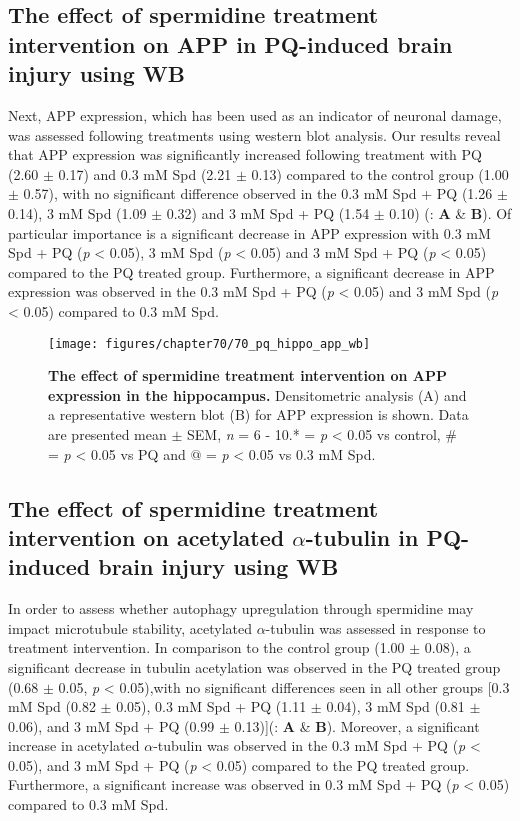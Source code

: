 \subsection{The effect of spermidine treatment intervention on APP in PQ-induced brain injury using WB}
Next, APP expression, which has been used as an indicator of neuronal damage, was assessed following treatments using western blot analysis. Our results reveal that APP expression was significantly increased following treatment with PQ (2.60 $\pm$ 0.17) and 0.3 mM Spd (2.21 $\pm$ 0.13) compared to the control group (1.00 $\pm$ 0.57), with no significant difference observed in the 0.3 mM Spd + PQ (1.26 $\pm$ 0.14), 3 mM Spd (1.09 $\pm$ 0.32) and 3 mM Spd + PQ (1.54 $\pm$ 0.10) (: \textbf{A} \& \textbf{B}). Of particular importance is a significant decrease in APP expression with 0.3 mM Spd + PQ (\textit{p} < 0.05), 3 mM Spd (\textit{p} < 0.05) and 3 mM Spd + PQ (\textit{p} < 0.05) compared to the PQ treated group. Furthermore, a significant decrease in APP expression was observed in the 0.3 mM Spd + PQ (\textit{p} < 0.05) and 3 mM Spd (\textit{p} < 0.05) compared to 0.3 mM Spd. 

\begin{figure}[!htbp]
\center
  \texttt{[image: figures/chapter70/70\_pq\_hippo\_app\_wb]}
  \caption[The effect of spermidine treatment intervention on APP expression in the hippocampus]{\textbf{The effect of spermidine treatment intervention on APP expression in the hippocampus.} Densitometric analysis (A) and a representative western blot (B) for APP expression is shown. Data are presented  mean $\pm$ SEM, \textit{n} = 6 - 10.* = \textit{p} < 0.05 vs control, \# = \textit{p} < 0.05 vs PQ and @ = \textit{p} < 0.05 vs 0.3 mM Spd.}
  \label{fig:70_pq_hippo_app_wb}
\end{figure} 

\subsection{The effect of spermidine treatment intervention on acetylated $\alpha$-tubulin in PQ-induced brain injury using WB}
In order to assess whether autophagy upregulation through spermidine may impact microtubule stability, acetylated $\alpha$-tubulin was assessed in response to treatment intervention. In comparison to the control group (1.00 $\pm$ 0.08), a significant decrease in tubulin acetylation was observed in the PQ treated group (0.68 $\pm$ 0.05, \textit{p} < 0.05),with no significant differences seen in all other groups [0.3 mM Spd (0.82 $\pm$ 0.05), 0.3 mM Spd + PQ (1.11 $\pm$ 0.04), 3 mM Spd (0.81 $\pm$ 0.06), and 3 mM Spd + PQ (0.99 $\pm$ 0.13)](: \textbf{A} \& \textbf{B}). Moreover, a significant increase in acetylated $\alpha$-tubulin was observed in the 0.3 mM Spd + PQ (\textit{p} < 0.05), and 3 mM Spd + PQ (\textit{p} < 0.05) compared to the PQ treated group. Furthermore, a significant increase was observed in 0.3 mM Spd + PQ (\textit{p} < 0.05) compared to 0.3 mM Spd.

